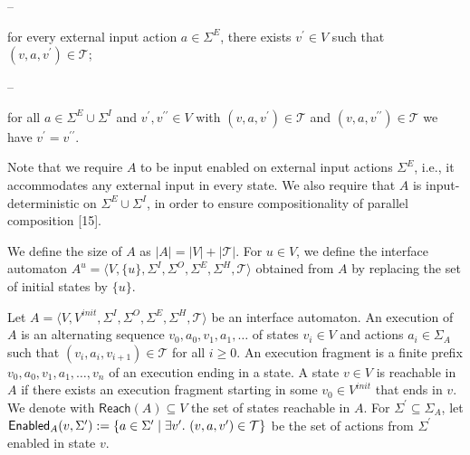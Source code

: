 \par\noindent  – 
 
for every external input action $a\in\Sigma^{E}$, there exists $v^{\prime}\in V$ such that $(v,a,v^{\prime})\in\mathcal{T}$;\par
 
 
 
\par\noindent  – 
 
for all $a\in\Sigma^{E}\cup\Sigma^{I}$ and $v^{\prime},v^{\prime\prime}\in V$ with $(v,a,v^{\prime})\in\mathcal{T}$ and $(v,a,v^{\prime\prime})\in\mathcal{T}$ we have $v^{\prime}=v^{\prime\prime}$.\par
 
 
  
 
  
 
 
 
Note that we require $A$ to be input enabled on external input actions $\Sigma^{E}$, i.e., it accommodates any external input in every state. We also require that $A$ is input-deterministic on $\Sigma^{E}\cup\Sigma^{I}$, in order to ensure compositionality of parallel composition [15].\par
 
 
 
We define the size of $A$ as $|A|=|V|+|\mathcal{T}|$. For $u\in V$, we define the interface automaton $A^{u}=\langle V,\{u\},\Sigma^{I},\Sigma^{O},\Sigma^{E},\Sigma^{H},\mathcal{T}\rangle$ obtained from $A$ by replacing the set of initial states by $\{u\}$.\par
 
 
 
Let $A=\langle V,V^{init},\Sigma^{I},\Sigma^{O},\Sigma^{E},\Sigma^{H},\mathcal{T}\rangle$ be an interface automaton. An execution of $A$ is an alternating sequence $v_{0},a_{0},v_{1},a_{1},\dots$ of states $v_{i}\in V$ and actions $a_{i}\in\Sigma_{A}$ such that $(v_{i},a_{i},v_{i+1})\in\mathcal{T}$ for all $i\geq 0$. An execution fragment is a finite prefix $v_{0},a_{0},v_{1},a_{1},\dots,v_{n}$ of an execution ending in a state. A state $v\in V$ is reachable in $A$ if there exists an execution fragment starting in some $v_{0}\in V^{init}$ that ends in $v$. We denote with $\mathsf{Reach}(A)\subseteq V$ the set of states reachable in $A$. For $\Sigma^{\prime}\subseteq\Sigma_{A}$, let $\mathsf{Enabled}_{A}(v,\Sigma^{\prime}):=\{a\in\Sigma^{\prime}\mid\exists v^{\prime}.\nobreak\ (v,a,v^{\prime})\in\mathcal{T}\}$ be the set of actions from $\Sigma^{\prime}$ enabled in state $v$.\par
 
